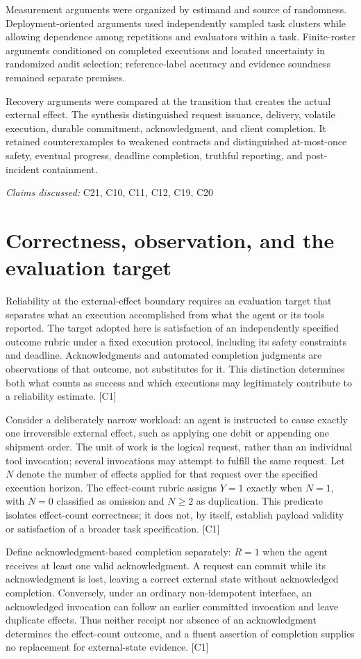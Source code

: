 \documentclass[11pt]{article}
\begin{document}
Measurement arguments were organized by estimand and source of randomness. Deployment-oriented arguments used independently sampled task clusters while allowing dependence among repetitions and evaluators within a task. Finite-roster arguments conditioned on completed executions and located uncertainty in randomized audit selection; reference-label accuracy and evidence soundness remained separate premises.

Recovery arguments were compared at the transition that creates the actual external effect. The synthesis distinguished request issuance, delivery, volatile execution, durable commitment, acknowledgment, and client completion. It retained counterexamples to weakened contracts and distinguished at-most-once safety, eventual progress, deadline completion, truthful reporting, and post-incident containment.

\textit{Claims discussed: }C21, C10, C11, C12, C19, C20
\section{Correctness, observation, and the evaluation target}
Reliability at the external-effect boundary requires an evaluation target that separates what an execution accomplished from what the agent or its tools reported. The target adopted here is satisfaction of an independently specified outcome rubric under a fixed execution protocol, including its safety constraints and deadline. Acknowledgments and automated completion judgments are observations of that outcome, not substitutes for it. This distinction determines both what counts as success and which executions may legitimately contribute to a reliability estimate. [C1]

Consider a deliberately narrow workload: an agent is instructed to cause exactly one irreversible external effect, such as applying one debit or appending one shipment order. The unit of work is the logical request, rather than an individual tool invocation; several invocations may attempt to fulfill the same request. Let $N$ denote the number of effects applied for that request over the specified execution horizon. The effect-count rubric assigns $Y=1$ exactly when $N=1$, with $N=0$ classified as omission and $N\geq 2$ as duplication. This predicate isolates effect-count correctness; it does not, by itself, establish payload validity or satisfaction of a broader task specification. [C1]

Define acknowledgment-based completion separately: $R=1$ when the agent receives at least one valid acknowledgment. A request can commit while its acknowledgment is lost, leaving a correct external state without acknowledged completion. Conversely, under an ordinary non-idempotent interface, an acknowledged invocation can follow an earlier committed invocation and leave duplicate effects. Thus neither receipt nor absence of an acknowledgment determines the effect-count outcome, and a fluent assertion of completion supplies no replacement for external-state evidence. [C1]
\end{document}
